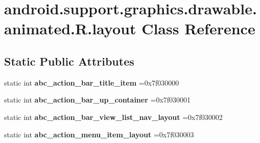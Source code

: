 \hypertarget{classandroid_1_1support_1_1graphics_1_1drawable_1_1animated_1_1R_1_1layout}{}\section{android.\+support.\+graphics.\+drawable.\+animated.\+R.\+layout Class Reference}
\label{classandroid_1_1support_1_1graphics_1_1drawable_1_1animated_1_1R_1_1layout}
\subsection*{Static Public Attributes}
\begin{DoxyCompactItemize}
\item 
\mbox{\label{classandroid_1_1support_1_1graphics_1_1drawable_1_1animated_1_1R_1_1layout_a7b84a8c8be143e7ed5c3f51d26e643f1}} 
static int {\bfseries abc\+\_\+action\+\_\+bar\+\_\+title\+\_\+item} =0x7f030000
\item 
\mbox{\label{classandroid_1_1support_1_1graphics_1_1drawable_1_1animated_1_1R_1_1layout_a34f72c2751c22328a66f9207d28d0aa7}} 
static int {\bfseries abc\+\_\+action\+\_\+bar\+\_\+up\+\_\+container} =0x7f030001
\item 
\mbox{\label{classandroid_1_1support_1_1graphics_1_1drawable_1_1animated_1_1R_1_1layout_a7f8149cdcdd43bf8990b20768f2ca6dd}} 
static int {\bfseries abc\+\_\+action\+\_\+bar\+\_\+view\+\_\+list\+\_\+nav\+\_\+layout} =0x7f030002
\item 
\mbox{\label{classandroid_1_1support_1_1graphics_1_1drawable_1_1animated_1_1R_1_1layout_aa5ca87b24043d22d069bc261b3d11134}} 
static int {\bfseries abc\+\_\+action\+\_\+menu\+\_\+item\+\_\+layout} =0x7f030003
\item 
\mbox{\label{classandroid_1_1support_1_1graphics_1_1drawable_1_1animated_1_1R_1_1layout_a009073f70d60b78b2f6372d1d6e53523}} 

\end{DoxyCompactItemize}
